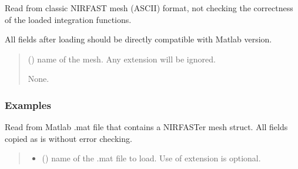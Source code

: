 \documentclass[letterpaper,10pt,english]{sphinxmanual}
\begin{document}
\begin{fulllineitems}
\begin{fulllineitems}
\label{\detokenize{_autosummary/nirfasterff.base.stnd_mesh.stndmesh:nirfasterff.base.stnd_mesh.stndmesh.from_file}}
\pysigstartsignatures
\pysiglinewithargsret
{}
{}
{}
\pysigstopsignatures
\sphinxAtStartPar
Read from classic NIRFAST mesh (ASCII) format, not checking the correctness of the loaded integration functions.

\sphinxAtStartPar
All fields after loading should be directly compatible with Matlab version.
\begin{quote}\begin{description}
\sphinxAtStartPar
{} () \textendash{} name of the mesh. Any extension will be ignored.

\sphinxAtStartPar
None.

\end{description}\end{quote}
\subsubsection*{Examples}

\begin{sphinxVerbatim}[commandchars=\\\{\}]
  
\end{sphinxVerbatim}

\end{fulllineitems}


\begin{fulllineitems}
\label{\detokenize{_autosummary/nirfasterff.base.stnd_mesh.stndmesh:nirfasterff.base.stnd_mesh.stndmesh.from_mat}}
\pysigstartsignatures
\pysiglinewithargsret
{}
{\sphinxparamcomma {}}
{}
\pysigstopsignatures
\sphinxAtStartPar
Read from Matlab .mat file that contains a NIRFASTer mesh struct. All fields copied as is without error checking.
\begin{quote}\begin{description}
\begin{itemize}
\item {} 
\sphinxAtStartPar
{} () \textendash{} name of the .mat file to load. Use of extension is optional.


\end{itemize}
\end{description}
\end{quote}
\end{fulllineitems}
\end{fulllineitems}
\end{document}
